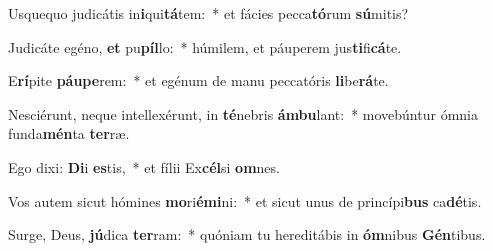\item Usquequo judicátis in\textbf{i}qui\textbf{tá}tem:~* et fácies pecca\textbf{tó}rum \textbf{sú}mitis?
\item Judicáte egéno, \textbf{et} pu\textbf{píl}lo:~* húmilem, et páuperem jus\textbf{ti}fi\textbf{cá}te.
\item E\textbf{rí}pite \textbf{páu}\textbf{pe}rem:~* et egénum de manu peccatóris \textbf{li}be\textbf{rá}te.
\item Nesciérunt, neque intellexérunt, in \textbf{té}nebris \textbf{ám}\textbf{bu}lant:~* movebúntur ómnia funda\textbf{mén}ta \textbf{ter}ræ.
\item Ego dixi: \textbf{Di}i \textbf{es}tis,~* et fílii Ex\textbf{cél}si \textbf{om}nes.
\item Vos autem sicut hómines \textbf{mo}ri\textbf{é}\textbf{mi}ni:~* et sicut unus de princípi\textbf{bus} ca\textbf{dé}tis.
\item Surge, Deus, \textbf{jú}dica \textbf{ter}ram:~* quóniam tu hereditábis in \textbf{óm}nibus \textbf{Gén}tibus.
